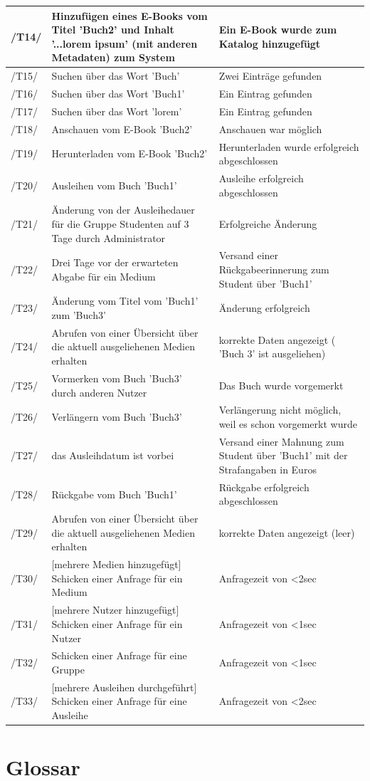 \documentclass[12pt, a4paper]{article}
\begin{document}
\begin{table}
	\begin{tabular}{p{1.2cm}|p{6.5cm}|p{5.5cm}}
		\hline
		/T14/ & Hinzufügen eines E-Books vom Titel  'Buch2'  und Inhalt  '...lorem ipsum'  (mit anderen Metadaten) zum System & Ein E-Book wurde zum Katalog hinzugefügt\\
		\hline
		/T15/ & Suchen über das Wort  'Buch'  & Zwei Einträge gefunden\\
		/T16/ & Suchen über das Wort  'Buch1'  & Ein Eintrag gefunden\\
		\hline
		/T17/ & Suchen über das Wort  'lorem'  & Ein Eintrag gefunden\\
		\hline
		/T18/ & Anschauen vom E-Book  'Buch2'  & Anschauen war möglich\\
		\hline
		/T19/ & Herunterladen vom E-Book  'Buch2'  & Herunterladen wurde erfolgreich abgeschlossen\\
		\hline
		/T20/ & Ausleihen vom Buch  'Buch1'  & Ausleihe erfolgreich abgeschlossen\\
		\hline
		/T21/ & Änderung von der Ausleihedauer für die Gruppe Studenten auf 3 Tage durch Administrator & Erfolgreiche Änderung\\
		\hline
		/T22/ & Drei Tage vor der erwarteten Abgabe für ein Medium & Versand einer Rückgabeerinnerung zum Student über 'Buch1' \\
		\hline
		/T23/ & Änderung vom Titel vom  'Buch1'  zum  'Buch3'  & Änderung erfolgreich\\
		\hline
		/T24/ & Abrufen von einer Übersicht über die aktuell ausgeliehenen Medien erhalten & korrekte Daten angezeigt ( 'Buch 3'  ist ausgeliehen)\\
		\hline
		/T25/ & Vormerken vom Buch 'Buch3' durch anderen Nutzer & Das Buch wurde vorgemerkt\\
		\hline
		/T26/ & Verlängern vom Buch 'Buch3' & Verlängerung nicht möglich, weil es schon vorgemerkt wurde\\
		\hline
		/T27/ & das Ausleihdatum ist vorbei & Versand einer Mahnung zum Student über  'Buch1'  mit der Strafangaben in Euros \\
		\hline
		/T28/ & Rückgabe vom Buch  'Buch1'  & Rückgabe erfolgreich abgeschlossen\\
		\hline
		/T29/ & Abrufen von einer Übersicht über die aktuell ausgeliehenen Medien erhalten & korrekte Daten angezeigt (leer)\\
		\hline
		/T30/ & [mehrere Medien hinzugefügt] Schicken einer Anfrage für ein Medium & Anfragezeit von \textless 2sec\\
		\hline
		/T31/ & [mehrere Nutzer hinzugefügt] Schicken einer Anfrage für ein Nutzer & Anfragezeit von \textless 1sec\\
		\hline
		/T32/ & Schicken einer Anfrage für eine Gruppe & Anfragezeit von \textless 1sec\\
		\hline
		/T33/ & [mehrere Ausleihen durchgeführt] Schicken einer Anfrage für eine Ausleihe & Anfragezeit von \textless 2sec\\
    \end{tabular}
\end{table}
\pagebreak

\section{Glossar}
\pagebreak
\end{document}
